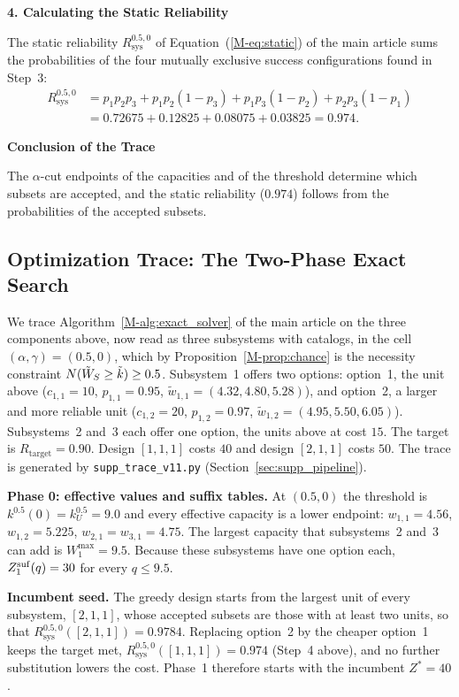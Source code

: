 \documentclass[11pt]{article}
\newcommand{\Rsys}{R_{\mathrm{sys}}}\newcommand{\Rtarget}{R_{\mathrm{target}}}
\begin{document}
\textbf{4. Calculating the Static Reliability}

The static reliability $\Rsys^{0.5,0}$ of Equation~(\ref*{M-eq:static}) of the main article sums the probabilities of
the four mutually exclusive success configurations found in Step~3:
\begin{align}
    \Rsys^{0.5,0} &= p_1p_2p_3 + p_1p_2(1-p_3) + p_1p_3(1-p_2) + p_2p_3(1-p_1) \nonumber \\
    &= 0.72675 + 0.12825 + 0.08075 + 0.03825 = 0.974 .
\end{align}

\textbf{Conclusion of the Trace}

The $\alpha$-cut endpoints of the capacities and of the threshold determine which subsets are accepted,
and the static reliability ($0.974$) follows from the probabilities of the accepted subsets.

\subsection{Optimization Trace: The Two-Phase Exact Search}

We trace Algorithm~\ref*{M-alg:exact_solver} of the main article on the three components above, now read as three subsystems with catalogs, in the cell $(\alpha,\gamma)=(0.5,0)$, which by Proposition~\ref*{M-prop:chance} is the necessity constraint $N(\tilde{W}_S\ge\tilde{k})\ge 0.5$. Subsystem~1 offers two options: option~1, the unit above ($c_{1,1}=10$, $p_{1,1}=0.95$, $\tilde{w}_{1,1}=(4.32, 4.80, 5.28)$), and option~2, a larger and more reliable unit ($c_{1,2}=20$, $p_{1,2}=0.97$, $\tilde{w}_{1,2}=(4.95, 5.50, 6.05)$). Subsystems~2 and~3 each offer one option, the units above at cost $15$. The target is $\Rtarget=0.90$. Design $[1,1,1]$ costs $40$ and design $[2,1,1]$ costs $50$. The trace is generated by \texttt{supp\_trace\_v11.py} (Section~\ref{sec:supp_pipeline}).

\textbf{Phase 0: effective values and suffix tables.} At $(0.5,0)$ the threshold is $k^{0.5}(0)=k_U^{0.5}=9.0$ and every effective capacity is a lower endpoint: $w_{1,1}=4.56$, $w_{1,2}=5.225$, $w_{2,1}=w_{3,1}=4.75$. The largest capacity that subsystems~2 and~3 can add is $W^{\mathrm{max}}_1=9.5$. Because these subsystems have one option each, $Z^{\mathrm{suf}}_1(q)=30$ for every $q\le 9.5$.

\textbf{Incumbent seed.} The greedy design starts from the largest unit of every subsystem, $[2,1,1]$, whose accepted subsets are those with at least two units, so that $\Rsys^{0.5,0}([2,1,1])=0.9784$. Replacing option~2 by the cheaper option~1 keeps the target met, $\Rsys^{0.5,0}([1,1,1])=0.974$ (Step~4 above), and no further substitution lowers the cost. Phase~1 therefore starts with the incumbent $Z^*=40$.
\end{document}
